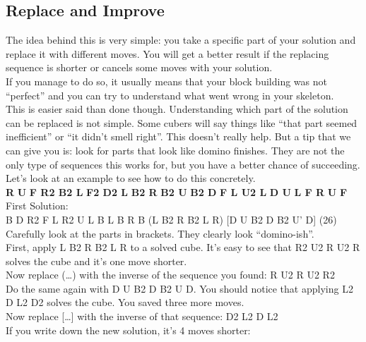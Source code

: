 \documentclass[11pt,a4paper]{book}
\newcommand{\p}{\textquotesingle}
\newcommand{\ps}{\p\,\,}
\begin{document}
\subsection{Replace and Improve}

The idea behind this is very simple: you take a specific part of your solution and replace it with different moves. You will get a better result if the replacing sequence is shorter or cancels some moves with your solution.\\
If you manage to do so, it usually means that your block building was not “perfect” and you can try to understand what went wrong in your skeleton.\\
This is easier said than done though. Understanding which part of the solution can be replaced is not simple. Some cubers will say things like “that part seemed inefficient” or “it didn’t smell right”. This doesn’t really help. But a tip that we can give you is: look for parts that look like domino finishes. They are not the only type of sequences this works for, but you have a better chance of succeeding.\\
\newline
Let’s look at an example to see how to do this concretely.\\
\newline
\textbf{R\ps U\ps F R2 B2 L\ps F2 D2 L\ps B2 R\ps B2 U\ps B2 D\ps F L U2 L\ps D U\ps L F R\ps U\ps F}\\
\newline
First Solution: \\
B\ps D\ps R2 F\ps L\ps R2 U L\ps B L B\ps R B (L\ps B2 R\ps B2 L R) [D U B2 D\ps B2 U’ D] (26)\\
\newline
Carefully look at the parts in brackets. They clearly look “domino-ish”.\\
First, apply L\ps B2 R\ps B2 L R to a solved cube. It's easy to see that R2 U2 R U2 R solves the cube and it's one move shorter.\\
Now replace (…) with the inverse of the sequence you found: R\ps U2 R\ps U2 R2\\
Do the same again with D U B2 D\ps B2 U\ps D. You should notice that applying L2 D L2 D2 solves the cube. You saved three more moves.\\
Now replace […] with the inverse of that sequence: D2 L2 D\ps L2\\
If you write down the new solution, it's 4 moves shorter:\\
\newline
\end{document}
